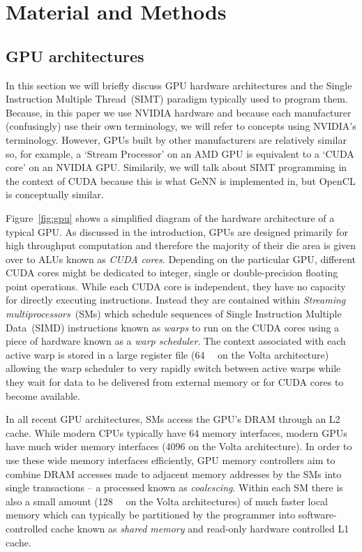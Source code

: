 \documentclass[utf8]{frontiersSCNS} %
\begin{document}
\section{Material and Methods}
\label{sec:method}
\subsection{GPU architectures}
\label{sec:method/gpu}
In this section we will briefly discuss GPU hardware architectures and the Single Instruction Multiple Thread~(SIMT) paradigm typically used to program them.
Because, in this paper we use NVIDIA hardware and because each manufacturer (confusingly) use their own terminology, we will refer to concepts using NVIDIA's terminology.
However, GPUs built by other manufacturers are relatively similar so, for example, a `Stream Processor' on an AMD GPU is equivalent to a `CUDA core' on an NVIDIA GPU.
Similarily, we will talk about SIMT programming in the context of CUDA because this is what GeNN is implemented in, but OpenCL is conceptually similar.

Figure~\ref{fig:gpu} shows a simplified diagram of the hardware architecture of a typical GPU.
As discussed in the introduction, GPUs are designed primarily for high throughput computation and therefore the majority of their die area is given over to ALUs known as \textit{CUDA cores}.
Depending on the particular GPU, different CUDA cores might be dedicated to integer, single or double-precision floating point operations.
While each CUDA core is independent, they have no capacity for directly executing instructions.
Instead they are contained within \textit{Streaming multiprocessors}~(SMs) which schedule sequences of Single Instruction Multiple Data~(SIMD) instructions known as \textit{warps} to run on the CUDA cores using a piece of hardware known as a \textit{warp scheduler}.
The context associated with each active warp is stored in a large register file (\SI{64}{\kilo\byte} on the Volta architecture) allowing the warp scheduler to very rapidly switch between active warps while they wait for data to be delivered from external memory or for CUDA cores to become available.

In all recent GPU architectures, SMs access the GPU's DRAM through an L2 cache.
While modern CPUs typically have \SI{64}{\bit} memory interfaces, modern GPUs have much wider memory interfaces (\SI{4096}{\bit} on the Volta architecture).
In order to use these wide memory interfaces efficiently, GPU memory controllers aim to combine DRAM accesses made to adjacent memory addresses by the SMs into single transactions -- a processed known as \textit{coalescing}.
Within each SM there is also a small amount (\SI{128}{\kilo\byte} on the Volta architectures) of much faster local memory which can typically be partitioned by the programmer into software-controlled cache known as \textit{shared memory} and read-only hardware controlled L1 cache.
\end{document}
